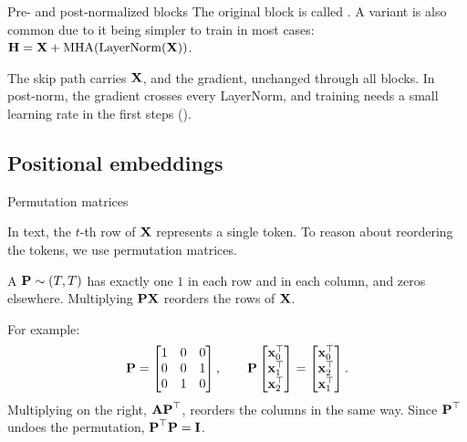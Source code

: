 \begin{frame}{Pre- and post-normalized blocks}
    The original block is called . A
     variant is also common due to it being simpler to
    train in most cases: $\boldsymbol{\mathbf{H}}=\boldsymbol{\mathbf{X}}+\operatorname{MHA}(\operatorname{LayerNorm}(\boldsymbol{\mathbf{X}}))$.

    The skip path carries $\boldsymbol{\mathbf{X}}$, and the gradient, unchanged through all
    blocks. In post-norm, the gradient crosses every LayerNorm, and training
    needs a small learning rate in the first steps ().


\end{frame}

\subsection{Positional embeddings}

\begin{frame}{Permutation matrices}
    \setlength{\parskip}{6pt}

    In text, the $t$-th row of $\boldsymbol{\mathbf{X}}$ represents a single token. To reason
    about reordering the tokens, we use permutation matrices.

    A  $\boldsymbol{\mathbf{P}}\sim(T,T)$ has exactly one $1$ in
    each row and in each column, and zeros elsewhere. Multiplying
    $\boldsymbol{\mathbf{P}}\boldsymbol{\mathbf{X}}$ reorders the rows of $\boldsymbol{\mathbf{X}}$.

    For example:
    \[
        \boldsymbol{\mathbf{P}}=\begin{bmatrix}1&0&0\\0&0&1\\0&1&0\end{bmatrix},
        \qquad
        \boldsymbol{\mathbf{P}}\begin{bmatrix}\boldsymbol{\mathbf{x}}_0^{\top}\\\boldsymbol{\mathbf{x}}_1^{\top}\\\boldsymbol{\mathbf{x}}_2^{\top}\end{bmatrix}
        =\begin{bmatrix}\boldsymbol{\mathbf{x}}_0^{\top}\\\boldsymbol{\mathbf{x}}_2^{\top}\\\boldsymbol{\mathbf{x}}_1^{\top}\end{bmatrix}.
    \]
    Multiplying on the right, $\boldsymbol{\mathbf{A}}\boldsymbol{\mathbf{P}}^{\top}$, reorders the columns in
    the same way. Since $\boldsymbol{\mathbf{P}}^{\top}$ undoes the permutation,
    $\boldsymbol{\mathbf{P}}^{\top}\boldsymbol{\mathbf{P}}=\boldsymbol{\mathbf{I}}$.

\end{frame}

